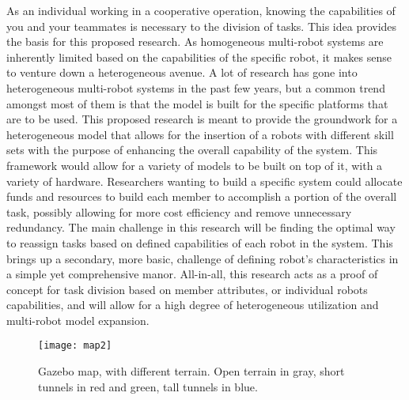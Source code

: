 As an individual working in a cooperative operation, knowing the capabilities
of you and your teammates is necessary to the division of tasks. This idea
provides the basis for this proposed research. As homogeneous multi-robot systems
are inherently limited based on the capabilities of the specific robot,
it makes sense to venture down a heterogeneous avenue. A lot of research
has gone into heterogeneous multi-robot systems in the past few years, but a
common trend amongst most of them is that the model is built for the specific
platforms that are to be used. This proposed research is meant to provide the
groundwork for a heterogeneous model that allows for the insertion of a
robots with different skill sets with the purpose of enhancing the overall
capability of the system. This framework would allow for a variety of models
to be built on top of it, with a variety of hardware. Researchers wanting to
build a specific system could allocate funds and resources to build each member
to accomplish a portion of the overall task, possibly allowing for more cost
efficiency and remove unnecessary redundancy. The main challenge in this
research will be finding the optimal way to reassign tasks based on defined
capabilities of each robot in the system. This brings up a secondary, more basic,
challenge of defining robot’s characteristics in a simple yet comprehensive manor.
All-in-all, this research acts as a proof of concept for task division based on member
attributes, or individual robots capabilities, and will allow for a high degree of
heterogeneous utilization and multi-robot model expansion.

\begin{figure}[H]
  \centering
    \texttt{[image: map2]}
  \caption{Gazebo map, with different terrain. Open terrain in gray, short tunnels in red and green, tall tunnels in blue.}
  \label{fig:map}
\end{figure}


